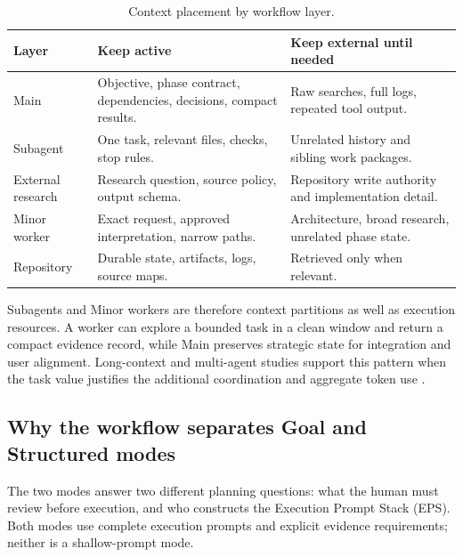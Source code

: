 \documentclass[11pt,a4paper]{article}
\begin{document}
\begin{table}[H]
\centering
\caption{Context placement by workflow layer.}
\begin{tabularx}{\textwidth}{P{0.16\textwidth}Y Y}
\toprule
\textbf{Layer} & \textbf{Keep active} & \textbf{Keep external until needed} \\
\midrule
Main & Objective, phase contract, dependencies, decisions, compact results. & Raw searches, full logs, repeated tool output. \\
Subagent & One task, relevant files, checks, stop rules. & Unrelated history and sibling work packages. \\
External research & Research question, source policy, output schema. & Repository write authority and implementation detail. \\
Minor worker & Exact request, approved interpretation, narrow paths. & Architecture, broad research, unrelated phase state. \\
Repository & Durable state, artifacts, logs, source maps. & Retrieved only when relevant. \\
\bottomrule
\end{tabularx}
\end{table}

Subagents and Minor workers are therefore context partitions as well as execution resources. A worker can explore a bounded task in a clean window and return a compact evidence record, while Main preserves strategic state for integration and user alignment. Long-context and multi-agent studies support this pattern when the task value justifies the additional coordination and aggregate token use \cite{zhang2024chainagents,anthropicmultiagent2025}.

\subsection{Why the workflow separates Goal and Structured modes}\label{sec:profile-rationale}

The two modes answer two different planning questions: what the human must review before execution,
and who constructs the Execution Prompt Stack (EPS). Both modes use complete execution prompts and explicit
evidence requirements; neither is a shallow-prompt mode.
\end{document}
